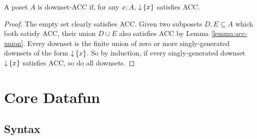 \documentclass{article}
\begin{document}
\begin{theorem}
  A poset $A$ is downset-ACC if, for any $x : A$, ${\downarrow}\,\{x\}$ satisfies ACC.
\end{theorem}
\begin{proof}
  The empty set clearly satisfies ACC. Given two subposets $D,E \subseteq A$
  which both satisfy ACC, their union $D \cup E$ also satisfies ACC by Lemma
  \ref{lemma:acc-union}. Every downset is the finite union of zero or more
  singly-generated downsets of the form ${\downarrow}\,\{x\}$. So by induction, if
  every singly-generated downset ${\downarrow}\,\{x\}$ satisfies ACC, so do all
  downsets.
\end{proof}


\section{Core Datafun}
\subsection{Syntax}
\end{document}
